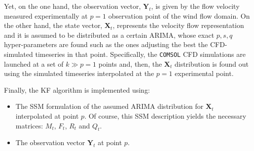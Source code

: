 \documentclass{article}
\theoremstyle{definition}
\theoremstyle{definition}
\theoremstyle{remark}
\theoremstyle{mythmstyle}
\begin{document}
Yet, on the one hand, the observation vector, $\bm{Y}_t$, is given by the flow velocity measured experimentally at $p=1$ observation point of the wind flow domain. On the other hand, the state vector, $\bm{X}_t$, represents the velocity flow representation and it is assumed to be distributed as a certain ARIMA, whose exact $p, s, q$ hyper-parameters are found such as the ones adjusting the best the CFD-simulated timeseries in that point. Specifically, the \texttt{COMSOL} CFD simulations are launched at a set of $k\gg p=1$ points and, then, the $\bm{X}_t$ distribution is found out using the simulated timeseries interpolated at the $p=1$ experimental point.  

Finally, the KF algorithm is implemented using:
\begin{itemize}
    \item The SSM formulation of the assumed ARIMA distribution for $\bm{X}_t$ interpolated at point $p$. Of course, this SSM description yields the necessary matrices: $M_t$, $F_t$, $R_t$ and $Q_t$.
    \item The observation vector $\bm{Y}_t$ at point $p$.
\end{itemize}
\end{document}
